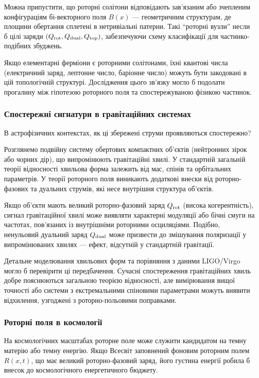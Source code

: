 \documentclass[11pt,a4paper]{article}
\numberwithin{equation}{section}
\theoremstyle{plain}
\theoremstyle{definition}
\theoremstyle{remark}
\begin{document}
Можна припустити, що роторні солітони відповідають зав'язаним або зчепленим конфігураціям бі-векторного поля $B(x)$ — геометричним структурам, де площини обертання сплетені в нетривіальні патерни. Такі ``роторні вузли'' несли б цілі заряди $(Q_{\rm rot}, Q_{\rm dual}, Q_{\rm top})$, забезпечуючи схему класифікації для частинко-подібних збуджень.

Якщо елементарні ферміони є роторними солітонами, їхні квантові числа (електричний заряд, лептонне число, баріонне число) можуть бути закодовані в цій топологічній структурі. Дослідження цього зв'язку могло б подолати прогалину між гіпотезою роторного поля та спостережуваною фізикою частинок.

\subsubsection{Спостережні сигнатури в гравітаційних системах}

В астрофізичних контекстах, як ці збережені струми проявляються спостережно?

Розглянемо подвійну систему обертових компактних об'єктів (нейтронних зірок або чорних дір), що випромінюють гравітаційні хвилі. У стандартній загальній теорії відносності хвильова форма залежить від мас, спінів та орбітальних параметрів. У теорії роторного поля виникають додаткові внески від роторно-фазових та дуальних струмів, які несе внутрішня структура об'єктів.

Якщо об'єкти мають великий роторно-фазовий заряд $Q_{\rm rot}$ (висока когерентність), сигнал гравітаційної хвилі може виявляти характерні модуляції або бічні смуги на частотах, пов'язаних із внутрішніми роторними осциляціями. Подібно, ненульовий дуальний заряд $Q_{\rm dual}$ може призвести до змішування поляризації у випромінюваних хвилях — ефект, відсутній у стандартній гравітації.

Детальне моделювання хвильових форм та порівняння з даними LIGO/Virgo могло б перевірити ці передбачення. Сучасні спостереження гравітаційних хвиль добре пояснюються загальною теорією відносності, але вимірювання вищої точності або системи з екстремальними спіновими параметрами можуть виявити відхилення, узгоджені з роторно-польовими поправками.

\subsubsection{Роторні поля в космології}

На космологічних масштабах роторне поле може служити кандидатом на темну матерію або темну енергію. Якщо Всесвіт заповнений фоновим роторним полем $R(x,t)$, що має великий роторно-фазовий заряд, його густина енергії робила б внесок до космологічного енергетичного бюджету.
\end{document}
